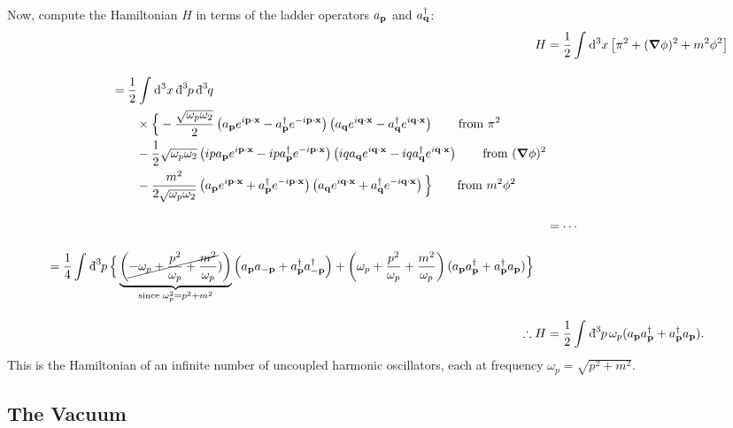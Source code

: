 Now, compute the Hamiltonian $H$ in terms of the ladder operators $a_{\vb{p}}$ and $a^{\dagger}_{\vb{q}}$:
\begin{align}
    H &= \frac{1}{2} \int_{}^{} \dd[3]{x} \left[ \pi^2 + (\grad \phi)^2 + m^2 \phi^2 \right] 
    \\[1em]
  \begin{split}
    &= \frac{1}{2} \int_{}^{} \dd[3]{x} \bdd[3]{p} \bdd[3]{q} \\
    & \qquad \times \Big\{ 
    -\frac{\sqrt{\omega_p \omega_2}}{2} \left( a_{\vb{p}} e^{i\vb{p}\cdot\vb{x}} - a^{\dagger}_{\vb{p}} e^{-i\vb{p}\cdot\vb{x}} \right)\left( a_{\vb{q}} e^{i\vb{q}\cdot\vb{x}} - a^{\dagger}_{\vb{q}} e^{i\vb{q}\cdot\vb{x}} \right) \qquad \text{from } \pi^2\\
    &\qquad-\frac{1}{2}\sqrt{\omega_p \omega_2} \left( i p a_{\vb{p}} e^{i\vb{p}\cdot\vb{x}} - ip a^{\dagger}_{\vb{p}} e^{-i\vb{p}\cdot\vb{x}} \right)
    \left(iq a_{\vb{q}} e^{i\vb{q}\cdot\vb{x}} - iqa^{\dagger}_{\vb{q}} e^{i\vb{q}\cdot\vb{x}} \right) \qquad \text{from } (\grad \phi)^2 \\
    &\qquad-\frac{m^2}{2\sqrt{\omega_p \omega_2}} \left( a_{\vb{p}} e^{i\vb{p}\cdot\vb{x}} + a^{\dagger}_{\vb{p}} e^{-i\vb{p}\cdot\vb{x}} \right)
    \left( a_{\vb{q}} e^{i\vb{q}\cdot\vb{x}} + a^{\dagger}_{\vb{q}} e^{-i\vb{q}\cdot\vb{x}} \right) \Big\} \qquad \text{from } m^2 \phi^2
  \end{split} 
  \\[1em]
  &= \cdots \nonumber
  \\[1em]
  \begin{split}
    &= \frac{1}{4} \int_{}^{} \bdd[3]{p} \Big\{ \underbrace{\left(\cancel{ -\omega_p + \frac{p^2}{\omega_p} + \frac{m^2}{\omega_p}})\right)}_{\text{since }\omega^2_p = p^2 + m^2} \left( a_{\vb{p}} a_{-\vb{p}} + a^{\dagger}_{\vb{p}} a_{-\vb{p}}^{\dagger} \right) + \left( \omega_p + \frac{p^2}{\omega_p} + \frac{m^2}{\omega_p} \right) (a_{\vb{p}} a^{\dagger}_{\vb{p}} + a^{\dagger}_{\vb{p}} a_{\vb{p}}) \Big\}
  \end{split}
  \\[1em]
  \therefore H &= \frac{1}{2} \int_{}^{} \bdd[3]{p} \omega_p (a_{\vb{p}} a^{\dagger}_{\vb{p}} + a^{\dagger}_{\vb{p}} a_{\vb{p}}).
\end{align}
This is the Hamiltonian of an infinite number of uncoupled harmonic oscillators, each at frequency $\omega_p = \sqrt{p^2 + m^2}$.

\subsection{The Vacuum}%
\label{sub:the_vacuum}

